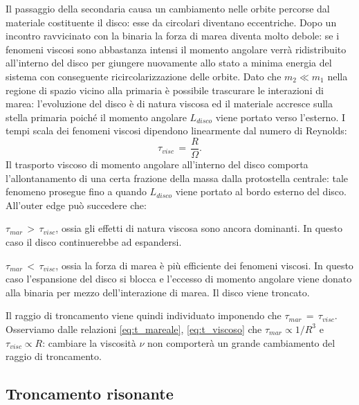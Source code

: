 Il passaggio della secondaria causa un cambiamento nelle orbite percorse dal materiale costituente il disco: esse da circolari diventano eccentriche.
Dopo un incontro ravvicinato con la binaria la forza di marea diventa molto debole: se i fenomeni viscosi sono abbastanza intensi il momento angolare verrà ridistribuito all'interno del disco per giungere nuovamente allo stato a minima energia del sistema con conseguente ricircolarizzazione delle orbite.
Dato che $m_2 \ll m_1$ nella regione di spazio vicino alla primaria è possibile trascurare le interazioni di marea: l'evoluzione del disco è di natura viscosa ed il materiale accresce sulla stella primaria poiché il momento angolare $L_{disco}$ viene portato verso l'esterno. 
I tempi scala dei fenomeni viscosi dipendono linearmente dal numero di Reynolds:
\begin{equation}
\tau_{visc}\,=\,\frac{R}{\Omega}.
\label{eq:t_viscoso}
\end{equation}
Il trasporto viscoso di momento angolare all'interno del disco comporta l'allontanamento di una certa frazione della massa dalla protostella centrale: tale fenomeno prosegue fino a quando $L_{disco}$ viene portato al bordo esterno del disco.
All'outer edge può succedere che:
\begin{list}{\textbf{-}}{\setlength{\itemsep}{0cm}}
    \item $\tau_{mar}\,>\,\tau_{visc}$, ossia gli effetti di natura viscosa sono ancora dominanti. In questo caso il disco continuerebbe ad espandersi.
    \item $\tau_{mar}\,<\,\tau_{visc}$, ossia la forza di marea è più efficiente dei fenomeni viscosi. In questo caso l'espansione del disco si blocca e l'eccesso di momento angolare viene donato alla binaria per mezzo dell'interazione di marea. Il disco viene troncato.
\end{list}

Il raggio di troncamento viene quindi individuato imponendo che $\tau_{mar}\,=\,\tau_{visc}$. Osserviamo dalle relazioni \eqref{eq:t_mareale}, \eqref{eq:t_viscoso} che $\tau_{mar} \propto 1/R^3$ e $\tau_{visc} \propto R$: cambiare la viscosità $\nu$ non comporterà un grande cambiamento del raggio di troncamento.

\subsection{Troncamento risonante}

